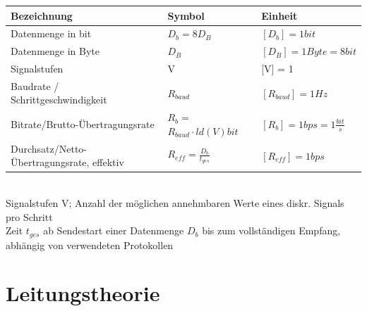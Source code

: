 \documentclass[fs, footer]{latex4ei}
\begin{document}
\begin{multicols*}{4}
{\begin{tabular*}{\columnwidth}{p{1.8cm} | p{1.6cm} | p{2.5cm}}
	Bezeichnung & Symbol & Einheit \\ \hline
	Datenmenge in bit & $D_b = 8 D_B $ & $[D_b] = 1 bit$   \\ \hline
	Datenmenge in Byte & $D_B$ & $[D_B] = 1 Byte = 8 bit  $  \\ \hline
	Signalstufen & V & [V] = 1   \\ \hline
	Baudrate / Schrittgeschwindigkeit & $R_{baud}$ & $[R_{baud}] = 1 Hz $   \\ \hline
	Bitrate/Brutto-Übertragungsrate & $R_b = $$ R_{baud} \cdot ld(V) bit $ & $[R_b] = 1 bps = 1 \frac{bit}{s} $  \\ \hline
	Durchsatz/Netto-Übertragungsrate, effektiv & $R_{eff} = \frac{D_b}{t_{ges}}$ & $[R_{eff}] = 1 bps $ \\
	
	
\end{tabular*}\\

	Signalstufen V; Anzahl der möglichen annehmbaren Werte eines diskr. Signals pro Schritt \\
	Zeit $t_{ges}$ ab Sendestart einer Datenmenge $D_b$ bis zum vollständigen Empfang, abhängig von verwendeten Protokollen \\
	
		
}

\section{Leitungstheorie}

\end{multicols*}
\end{document}

